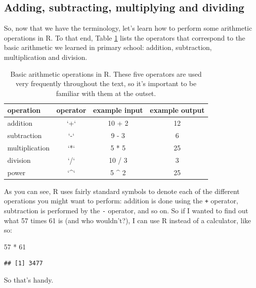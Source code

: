 \documentclass[
]{book}
\newenvironment{Shaded}{\begin{snugshade}}{\end{snugshade}}
\newcommand{\DecValTok}[1]{\textcolor[rgb]{0.00,0.00,0.81}{#1}}
\newcommand{\SpecialCharTok}[1]{\textcolor[rgb]{0.00,0.00,0.00}{#1}}
\begin{document}
\hypertarget{adding-subtracting-multiplying-and-dividing}{%
\subsection{Adding, subtracting, multiplying and dividing}\label{adding-subtracting-multiplying-and-dividing}}

So, now that we have the terminology, let's learn how to perform some arithmetic operations in R. To that end, Table \ref{tab:arithmetic1} lists the operators that correspond to the basic arithmetic we learned in primary school: addition, subtraction, multiplication and division.

\begin{table}

\caption{\label{tab:arithmetic1}Basic arithmetic operations in R. These five operators are used very frequently throughout the text, so it's important to be familiar with them at the outset.}
\centering
\begin{tabular}[t]{lccc}
\toprule
operation & operator & example input & example output\\
\midrule
addition & `+` & 10 + 2 & 12\\
subtraction & `-` & 9 - 3 & 6\\
multiplication & `*` & 5 * 5 & 25\\
division & `/` & 10 / 3 & 3\\
power & `\textasciicircum{}` & 5 \textasciicircum{} 2 & 25\\
\bottomrule
\end{tabular}
\end{table}

As you can see, R uses fairly standard symbols to denote each of the different operations you might want to perform: addition is done using the \texttt{+} operator, subtraction is performed by the \texttt{-} operator, and so on. So if I wanted to find out what 57 times 61 is (and who wouldn't?), I can use R instead of a calculator, like so:

\begin{Shaded}
\begin{Highlighting}[]
\DecValTok{57} \SpecialCharTok{*} \DecValTok{61}
\end{Highlighting}
\end{Shaded}

\begin{verbatim}
## [1] 3477
\end{verbatim}

So that's handy.
\end{document}

